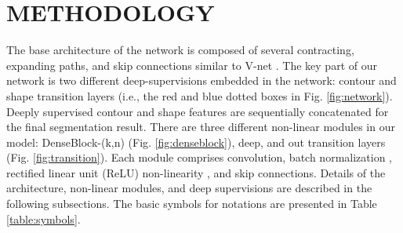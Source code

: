 \documentclass[journal]{IEEEtran}
\begin{document}
\section{METHODOLOGY}

The base architecture of the network is composed of several contracting, expanding paths, and skip connections similar to V-net \cite{milletari2016v}. The key part of our network is two different deep-supervisions embedded in the network: contour and shape transition layers (i.e., the red and blue dotted boxes in Fig. \ref{fig:network}). Deeply supervised contour and shape features are sequentially concatenated for the final segmentation result. There are three different non-linear modules in our model: DenseBlock-(k,n) (Fig. \ref{fig:denseblock}), deep, and out transition layers (Fig. \ref{fig:transition}). Each module comprises convolution, batch normalization \cite{ioffe2015batch}, rectified linear unit (ReLU) non-linearity \cite{nair2010rectified}, and skip connections. Details of the architecture, non-linear modules, and deep supervisions are described in the following subsections. The basic symbols for notations are presented in Table \ref{table:symbols}.


\end{document}

